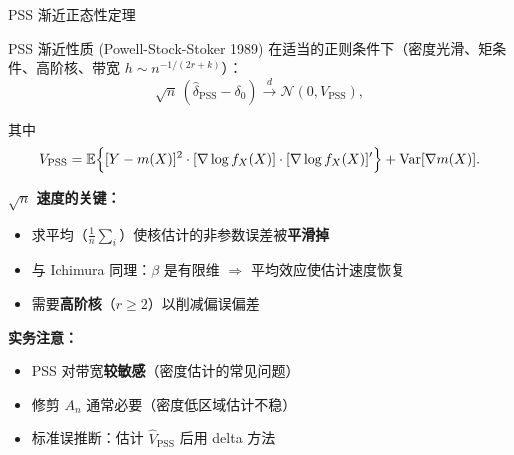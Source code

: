 \documentclass[aspectratio=169, 10pt]{beamer}
\begin{document}
\begin{frame}[shrink=10]{PSS 渐近正态性定理}

  \begin{definitionbox}{{PSS 渐近性质 (Powell-Stock-Stoker 1989)}}
    在适当的正则条件下（密度光滑、矩条件、高阶核、带宽 $h \sim n^{-1/(2r+k)}$）：
    $$\sqrt{n}\,(\hat\delta_{\text{PSS}} - \delta_0) \overset{d}{\to} \mathcal{N}(0, V_{\text{PSS}}),$$

    其中
    $$V_{\text{PSS}} = \mathbb{E}\Bigl\{[Y - m(X)]^2 \cdot
    [\nabla \log f_X(X)] \cdot [\nabla \log f_X(X)]'\Bigr\}
    + \text{Var}[\nabla m(X)].$$
  \end{definitionbox}

  \begin{highlightbox}
    \textbf{$\sqrt{n}$ 速度的关键：}
    \begin{itemize}\setlength{\itemsep}{1pt}
      \item 求平均（$\frac{1}{n}\sum_i$）使核估计的非参数误差被\textbf{平滑掉}
      \item 与 Ichimura 同理：$\beta$ 是有限维 $\Rightarrow$ 平均效应使估计速度恢复
      \item 需要\textbf{高阶核}（$r \geq 2$）以削减偏误偏差
    \end{itemize}
  \end{highlightbox}

  \textbf{实务注意：}
  \begin{itemize}\setlength{\itemsep}{1pt}
    \item PSS 对带宽\textbf{较敏感}（密度估计的常见问题）
    \item 修剪 $A_n$ 通常必要（密度低区域估计不稳）
    \item 标准误推断：估计 $\hat V_{\text{PSS}}$ 后用 delta 方法
  \end{itemize}

  \hypertarget{main-c8}{}
  \hfill{\scriptsize\hyperlink{proof-c8}{}}

\end{frame}
\end{document}
